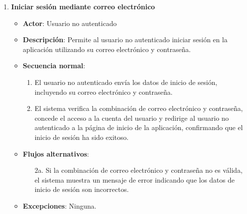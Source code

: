 \begin{enumerate}[label=UC-\protect\twodigits{\arabic*}:, align=left, leftmargin=*]
\item \textbf{Iniciar sesión mediante correo electrónico}
\begin{itemize}
\item \textbf{Actor}: Usuario no autenticado
\item \textbf{Descripción}: Permite al usuario no autenticado iniciar sesión en la aplicación utilizando su correo electrónico y contraseña.
\item \textbf{Secuencia normal}:
\begin{enumerate}[label={\arabic*}:]
\item El usuario no autenticado envía los datos de inicio de sesión, incluyendo su correo electrónico y contraseña.
\item El sistema verifica la combinación de correo electrónico y contraseña, concede el acceso a la cuenta del usuario y redirige al usuario no autenticado a la página de inicio de la aplicación, confirmando que el inicio de sesión ha sido exitoso.
\end{enumerate}
\item \textbf{Flujos alternativos}:
\begin{itemize}
\item[2a.] Si la combinación de correo electrónico y contraseña no es válida, el sistema muestra un mensaje de error indicando que los datos de inicio de sesión son incorrectos.
\end{itemize}
\item \textbf{Excepciones}: Ninguna.
\end{itemize}


\end{enumerate}
